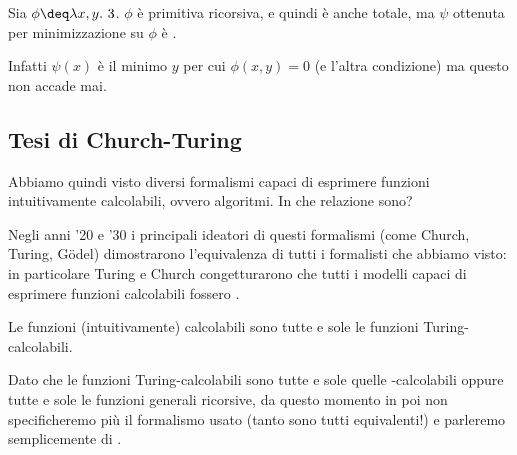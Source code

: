 \begin{example}
    Sia $\phi \deq \lam{x, y}{3}$. $\phi$ è primitiva ricorsiva, e quindi è anche totale, ma $\psi$ ottenuta per minimizzazione su $\phi$ è .
    
    Infatti $\psi(x)$ è il minimo $y$ per cui $\phi(x, y) = 0$ (e l'altra condizione) ma questo non accade mai.   
\end{example}

\subsection{Tesi di Church-Turing}

Abbiamo quindi visto diversi formalismi capaci di esprimere funzioni intuitivamente calcolabili, ovvero algoritmi. In che relazione sono?

Negli anni '20 e '30 i principali ideatori di questi formalismi (come Church, Turing, G\"odel) dimostrarono l'equivalenza di tutti i formalisti che abbiamo visto: in particolare Turing e Church congetturarono che tutti i modelli capaci di esprimere funzioni calcolabili fossero .

\begin{theorem}
    Le funzioni (intuitivamente) calcolabili sono tutte e sole le funzioni Turing-calcolabili.
\end{theorem}

Dato che le funzioni Turing-calcolabili sono tutte e sole quelle \WHILE-calcolabili oppure tutte e sole le funzioni generali ricorsive, da questo momento in poi non specificheremo più il formalismo usato (tanto sono tutti equivalenti!) e parleremo semplicemente di .
